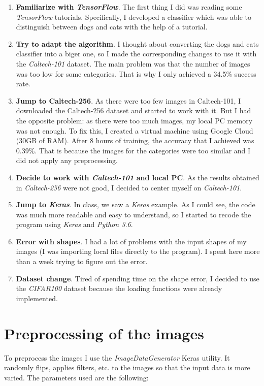 \documentclass[12pt,spanish]{article}
\begin{document}
\begin{enumerate}
	\item \textbf{Familiarize with \emph{TensorFlow}}. The first thing I did was reading some \emph{TensorFlow} tutorials. Specifically, I developed a classifier which was able to distinguish between dogs and cats with the help of a tutorial. 
	\item \textbf{Try to adapt the algorithm}. I thought about converting the dogs and cats classifier into a biger one, so I made the corresponding changes to use it with the \emph{Caltech-101} dataset. The main problem was that the number of images was too low for some categories. That is why I only achieved a 34.5\% success rate.
	\item \textbf{Jump to Caltech-256}. As there were too few images in Caltech-101, I downloaded the Caltech-256 dataset and started to work with it. But I had the opposite problem: as there were too much images, my local PC memory was not enough. To fix this, I created a virtual machine using Google Cloud (30GB of RAM). After 8 hours of training, the accuracy that I achieved was  0.39\%. That is because the images for the categories were too similar and I did not apply any preprocessing.
	\item \textbf{Decide to work with \emph{Caltech-101} and local PC}. As the results obtained in \emph{Caltech-256} were not good, I decided to center myself on \emph{Caltech-101}.
	\item \textbf{Jump to \emph{Keras}}. In class, we saw a \emph{Keras} example. As I could see, the code was much more readable and easy to understand, so I started to recode the program using \emph{Keras} and \emph{Python 3.6}.
	\item \textbf{Error with shapes}. I had a lot of problems with the input shapes of my images (I was importing local files directly to the program). I spent here more than a week trying to figure out the error. 
	\item \textbf{Dataset change}. Tired of spending time on the shape error, I decided to use the \emph{CIFAR100} dataset because the loading functions were already implemented.
\end{enumerate}

\section{Preprocessing of the images}

To preprocess the images I use the \emph{ImageDataGenerator} Keras utility. It randomly flips, applies filters, etc. to the images so that the input data is more varied. The parameters used are the following:
\end{document}

